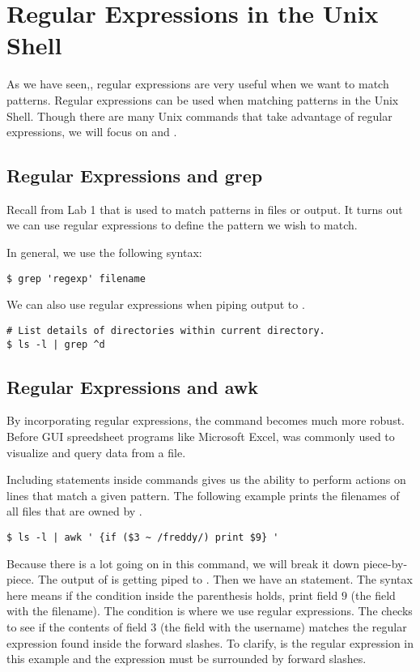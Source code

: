 \section*{Regular Expressions in the Unix Shell}
As we have seen,, regular expressions are very useful when we want to match patterns.
Regular expressions can be used when matching patterns in the Unix Shell.
Though there are many Unix commands that take advantage of regular expressions, we will focus on  and .

\subsection*{Regular Expressions and grep}
Recall from Lab 1 that  is used to match patterns in files or output.
It turns out we can use regular expressions to define the pattern we wish to match.

In general, we use the following syntax:
\begin{lstlisting}
$ grep 'regexp' filename
\end{lstlisting}

We can also use regular expressions when piping output to .
\begin{lstlisting}
# List details of directories within current directory.
$ ls -l | grep ^d
\end{lstlisting}

\subsection*{Regular Expressions and awk}
By incorporating regular expressions, the  command becomes much more robust.
Before GUI spreedsheet programs like Microsoft Excel,  was commonly used to visualize and query data from a file.

Including  statements inside  commands gives us the ability to perform actions on lines that match a given pattern.
The following example prints the filenames of all files that are owned by .
\begin{lstlisting}
$ ls -l | awk ' {if ($3 ~ /freddy/) print $9} '
\end{lstlisting}

Because there is a lot going on in this command, we will break it down piece-by-piece.
The output of  is getting piped to . Then we have an  statement.
The syntax here means if the condition inside the parenthesis holds, print field $9$ (the field with the filename). The condition is where we use regular expressions.
The \li{\~} checks to see if the contents of field $3$ (the field with the username) matches the regular expression found inside the forward slashes.
To clarify,  is the regular expression in this example and the expression must be surrounded by forward slashes.

